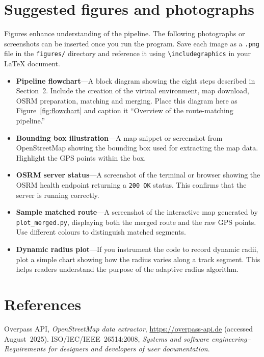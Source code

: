 \documentclass[12pt,a4paper]{article}
\begin{document}
\section{Suggested figures and photographs}
Figures enhance understanding of the pipeline.  The following photographs or
screenshots can be inserted once you run the program.  Save each image as a
\texttt{.png} file in the \texttt{figures/} directory and reference it using
\verb|\includegraphics| in your LaTeX document.
\begin{itemize}
	\item \textbf{Pipeline flowchart}---A block diagram showing the eight steps
	      described in Section~2.  Include the creation of the virtual
	      environment, map download, OSRM preparation, matching and merging.
	      Place this diagram here as Figure~\ref{fig:flowchart} and caption it
	      ``Overview of the route-matching pipeline.''
	\item \textbf{Bounding box illustration}---A map snippet or screenshot from
	      OpenStreetMap showing the bounding box used for extracting the map
	      data.  Highlight the GPS points within the box.
	\item \textbf{OSRM server status}---A screenshot of the terminal or browser
	      showing the OSRM health endpoint returning a \texttt{200 OK} status.  This
	      confirms that the server is running correctly.
	\item \textbf{Sample matched route}---A screenshot of the interactive map
	      generated by \texttt{plot\_merged.py}, displaying both the merged
	      route and the raw GPS points.  Use different colours to distinguish
	      matched segments.
	\item \textbf{Dynamic radius plot}---If you instrument the code to record
	      dynamic radii, plot a simple chart showing how the radius varies along
	      a track segment.  This helps readers understand the purpose of the
	      adaptive radius algorithm.
\end{itemize}

\section*{References}
\begin{thebibliography}{9}
	 Overpass API, \emph{OpenStreetMap data extractor},
	\url{https://overpass-api.de} (accessed August~2025).
	 ISO/IEC/IEEE~26514:2008, \emph{Systems and software
		engineering--Requirements for designers and developers of user documentation}.
\end{thebibliography}
\end{document}
